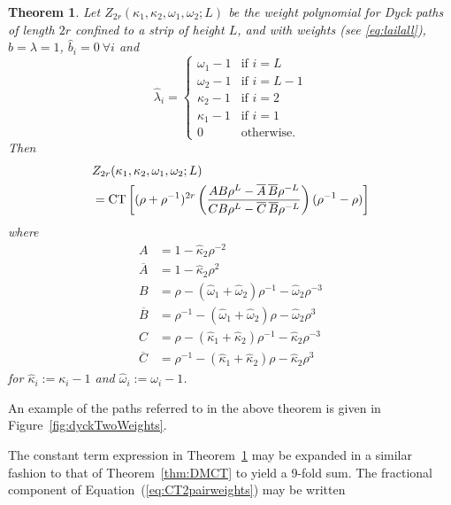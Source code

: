 \documentclass[11pt,a4paper]{article}
\DeclareMathOperator{\CT}{CT}
\newtheorem{theorem}{Theorem}
\newcommand{\Abar}{\overline{A}}
\newcommand{\Bbar}{\overline{B}}
\newcommand{\Cbar}{\overline{C}}
\newcommand{\ka}{\kappa}
\newcommand{\w}{\omega}
\newcommand{\p}{\rho}
\newcommand{\df}{:=}
\begin{document}
\begin{theorem} \label{thm:2pairweightsCT}  Let $Z_{2r}(\ka_1, \ka_2, \w_1, \w_2;L)$ be the weight polynomial for Dyck paths of length $2r$ confined to a strip of height $L$,   
and with weights (see \eqref{eq:lailall}),  $b=\lambda=1$, $\hat b_i=0\ \forall i$ and
\begin{equation}
	\hat\lambda_i=\begin{cases}
		\omega_1-1 & \text{if $i=L$}\\
		\omega_2-1 & \text{if $i=L-1$}\\
		\kappa_2-1 & \text{if $i=2$}\\
		\kappa_1-1 & \text{if $i=1$}\\
		0 & \text{otherwise.}
	\end{cases}
\label{eq_dirubext}
\end{equation}
Then 
\begin{align} \label{eq:CT2pairweights}
&Z_{2r}(\ka_1, \ka_2, \w_1, \w_2;L)\notag \\
&=\CT \left [ (\p+\p^{-1})^{2r} \left ( \frac{AB \p^L - \Abar \,\Bbar \p^{-L}}{C B \p^L - \Cbar\, \Bbar \p^{-L}}\right ) (\p^{-1}-\p)\right ]
\end{align}
where
\begin{subequations}
\begin{align}
A &= 1 - \hat{\ka}_2 \p^{-2}\\
\Abar &= 1 - \hat{\ka}_2 \p^{2}\\
B &= \p - (\hat{\w}_1+\hat{\w}_2)\p^{-1} -\hat{\w}_2\p^{-3}\\
\Bbar &= \p^{-1} - (\hat{\w}_1+\hat{\w}_2)\p -\hat{\w}_2\p^3\\
C &= \p - (\hat{\ka}_1+\hat{\ka}_2)\p^{-1} -\hat{\ka}_2\p^{-3}\\
\Cbar &= \p^{-1} - (\hat{\ka}_1+\hat{\ka}_2)\p -\hat{\ka}_2\p^{3}
\end{align}	
\end{subequations}
for $\hat{\ka}_i \df  \ka_i -1$ and $\hat{\w}_i \df  \w_i - 1$.
\end{theorem}
An example of the paths referred to in the above theorem is given in Figure~\ref{fig:dyckTwoWeights}.

The constant term expression in Theorem~\ref{thm:2pairweightsCT} may be expanded in a similar fashion to that of Theorem~\ref{thm:DMCT} to yield a 9-fold sum.  The fractional component of Equation~(\ref{eq:CT2pairweights}) may be written 
\end{document}
